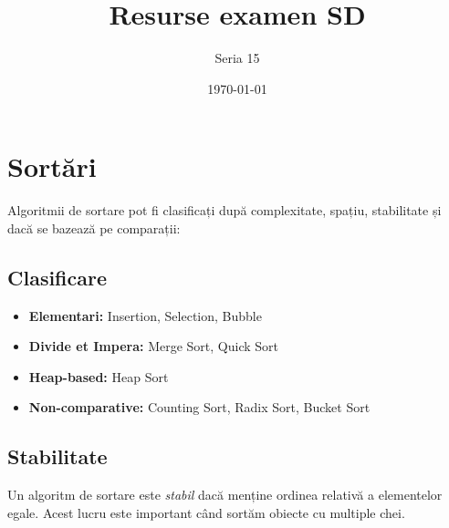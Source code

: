 \documentclass[11pt,a4paper]{article}
\title{Resurse examen SD}
\author{Seria 15}
\date{\today}
\theoremstyle{definition}
\theoremstyle{plain}
\theoremstyle{remark}
\begin{document}
\maketitle
\tableofcontents
\newpage

\section{Sortări}
Algoritmii de sortare pot fi clasificați după complexitate, spațiu, stabilitate și dacă se bazează pe comparații:

\subsection{Clasificare}
\begin{itemize}
  \item \textbf{Elementari:} Insertion, Selection, Bubble
  \item \textbf{Divide et Impera:} Merge Sort, Quick Sort
  \item \textbf{Heap-based:} Heap Sort
  \item \textbf{Non-comparative:} Counting Sort, Radix Sort, Bucket Sort
\end{itemize}

\subsection{Stabilitate}
Un algoritm de sortare este \emph{stabil} dacă menține ordinea relativă a elementelor egale. Acest lucru este important când sortăm obiecte cu multiple chei.
\end{document}
